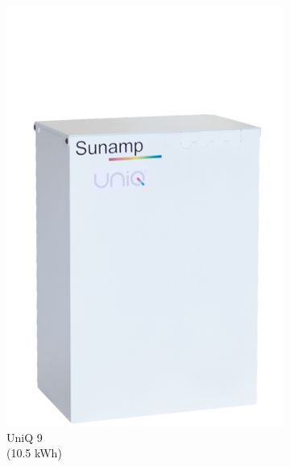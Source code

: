 \begin{figure}[htbp]
\begin{subfigure}{.24\textwidth}
	\includegraphics[width=\textwidth]{figures/sunamp-uniq-9.png}
	\caption{UniQ 9\\
		(10.5 kWh)}
	\label{fig:uniq9}
	\end{subfigure}
	\begin{subfigure}{.24\textwidth}
	\centering

\end{subfigure}
\end{figure}
